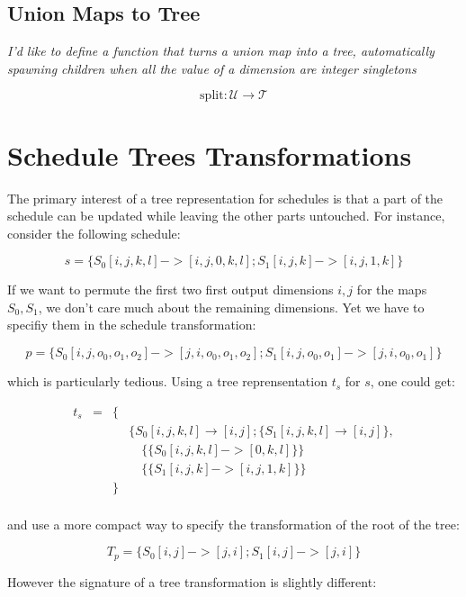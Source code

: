 \documentclass{article}
\begin{document}
\subsection{Union Maps to Tree}

{
    \raggedleft\emph{I'd like to define a function that turns a union map into a tree, automatically spawning children when all the value of a dimension are integer singletons}
}

\[
    \text{split}: \mathcal{U} \rightarrow \mathcal{T}
\]


\section{Schedule Trees Transformations}

The primary interest of a tree representation for schedules is that a part of
the schedule can be updated while leaving the other parts untouched. For instance, consider the following schedule:

\[
    s = \{ S_0[i,j,k,l] -> [i,j,0,k,l] ; S_1[i,j,k] -> [i,j,1,k] \}
\]

If we want to permute the first two first output dimensions $i, j$ for the maps
$S_0, S_1$, we don't care much about the remaining dimensions. Yet we have to
specifiy them in the schedule transformation:

\[
    p = \{ S_0[i,j,o_0,o_1,o_2] -> [j,i,o_0,o_1,o_2] ; S_1[i,j,o_0, o_1] -> [j,i,o_0,o_1] \}
\]

\noindent which is particularly tedious. Using a tree reprensentation $t_s$ for $s$, one could get:

\[
    \begin{array}{lcll}
        t_s &=& \{ &\\
            & &    & \{S_0[i,j,k,l] \rightarrow [i,j] ; \{S_1[i,j,k,l] \rightarrow [i,j] \},\\
            & &    & \quad\{ \{ S_0[i,j,k,l] -> [0,k,l] \} \}\\
            & &    & \quad\{ \{ S_1[i,j,k] -> [i,j,1,k] \} \}\\
            & & \} &\\
    \end{array}
\]

\noindent and use a more compact way to specify the transformation of the root of the tree:

\[
    T_p = \{ S_0[i,j] -> [j,i] ; S_1[i,j] -> [j,i] \}
\]

However the signature of a tree transformation is slightly different:
\end{document}
